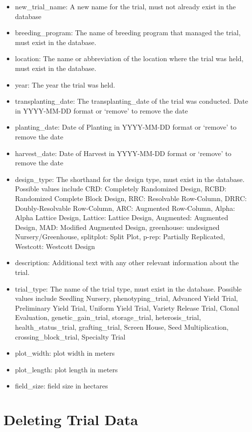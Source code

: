 \documentclass[
  12pt,
]{book}
\providecommand{\tightlist}{%
  \setlength{\itemsep}{0pt}\setlength{\parskip}{0pt}}
\begin{document}
\begin{itemize}
\tightlist
\item
  new\_trial\_name: A new name for the trial, must not already exist in the database
\item
  breeding\_program: The name of breeding program that managed the trial, must exist in the database.
\item
  location: The name or abbreviation of the location where the trial was held, must exist in the database.
\item
  year: The year the trial was held.
\item
  transplanting\_date: The transplanting\_date of the trial was conducted. Date in YYYY-MM-DD format or `remove' to remove the date
\item
  planting\_date: Date of Planting in YYYY-MM-DD format or `remove' to remove the date
\item
  harvest\_date: Date of Harvest in YYYY-MM-DD format or `remove' to remove the date
\item
  design\_type: The shorthand for the design type, must exist in the database. Possible values include CRD: Completely Randomized Design, RCBD: Randomized Complete Block Design, RRC: Resolvable Row-Column, DRRC: Doubly-Resolvable Row-Column, ARC: Augmented Row-Column, Alpha: Alpha Lattice Design, Lattice: Lattice Design, Augmented: Augmented Design, MAD: Modified Augmented Design, greenhouse: undesigned Nursery/Greenhouse, splitplot: Split Plot, p-rep: Partially Replicated, Westcott: Westcott Design
\item
  description: Additional text with any other relevant information about the trial.
\item
  trial\_type: The name of the trial type, must exist in the database. Possible values include Seedling Nursery, phenotyping\_trial, Advanced Yield Trial, Preliminary Yield Trial, Uniform Yield Trial, Variety Release Trial, Clonal Evaluation, genetic\_gain\_trial, storage\_trial, heterosis\_trial, health\_status\_trial, grafting\_trial, Screen House, Seed Multiplication, crossing\_block\_trial, Specialty Trial
\item
  plot\_width: plot width in meters
\item
  plot\_length: plot length in meters
\item
  field\_size: field size in hectares
\end{itemize}

\hypertarget{deleting-trial-data}{%
\section{Deleting Trial Data}\label{deleting-trial-data}}
\end{document}
